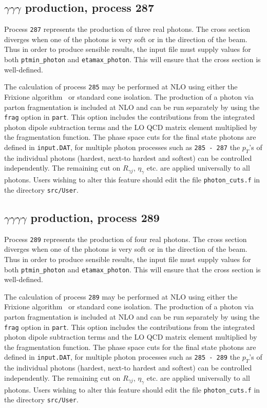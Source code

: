 \documentclass{article}
\begin{document}
{{{{{{\subsection{$\gamma\gamma\gamma$ production, process 287}
\label{subsec:trigam}

Process {\tt 287} represents the production of three real photons.
The cross section diverges
when one of the photons is very soft or in the direction of the beam.
Thus in order to produce sensible results, the input file must supply values for both
{\tt ptmin\_photon} and {\tt etamax\_photon}. This will ensure that
the cross section is well-defined.

The calculation of process {\tt 285} may be performed at NLO using either the
Frixione algorithm~\cite{Frixione:1998jh} or standard cone isolation.  The production of a photon via parton fragmentation is included at NLO and 
can be run separately by using the {\tt frag} option in {\tt part}. This option includes the contributions from the integrated 
photon dipole subtraction terms and the LO QCD matrix element multiplied by the fragmentation function.  
The phase space cuts for the final state photons are defined in {\tt{input.DAT}}, for multiple photon processes such 
as {\tt 285 - 287} the $p_T$'s of the individual photons (hardest, next-to hardest and softest) can be controlled independently. 
The remaining cut on $R_{\gamma j}$, $\eta_{\gamma}$ etc. are applied universally to all photons. Users wishing to alter
this feature should edit the file {\tt{photon\_cuts.f}} in the directory {\tt{src/User}}. 


\subsection{$\gamma\gamma\gamma\gamma$ production, process 289}
\label{subsec:fourgam}

Process {\tt 289} represents the production of four real photons.
The cross section diverges
when one of the photons is very soft or in the direction of the beam.
Thus in order to produce sensible results, the input file must supply values for both
{\tt ptmin\_photon} and {\tt etamax\_photon}. This will ensure that
the cross section is well-defined.

The calculation of process {\tt 289} may be performed at NLO using either the
Frixione algorithm~\cite{Frixione:1998jh} or standard cone isolation.  The production of a photon via parton fragmentation is included at NLO and
can be run separately by using the {\tt frag} option in {\tt part}. This option includes the contributions from the integrated
photon dipole subtraction terms and the LO QCD matrix element multiplied by the fragmentation function.
The phase space cuts for the final state photons are defined in {\tt{input.DAT}}, for multiple photon processes such
as {\tt 285 - 289} the $p_T$'s of the individual photons (hardest, next-to hardest and softest) can be controlled independently.
The remaining cut on $R_{\gamma j}$, $\eta_{\gamma}$ etc. are applied universally to all photons. Users wishing to alter
this feature should edit the file {\tt{photon\_cuts.f}} in the directory {\tt{src/User}}.

}}}}}}
\end{document}
